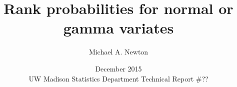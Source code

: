\newcommand{\fulltitle}{Rank probabilities for normal or gamma variates}
\newcommand{\wrappedfulltitle}{Rank probabilities for normal or gamma variates}
  
\newcommand{\longdate}{December 2015 \\
  UW Madison Statistics Department Technical Report \#?? }
\newcommand{\shortdate}{2/10}
\newcommand{\keywords}{gamma ranking; Viterbi algorithm } 


 
\renewcommand{\baselinestretch}{1.2}
\title{\wrappedfulltitle}
\author{
 \renewcommand{\thefootnote}{\arabic{footnote}}
 Michael A. Newton\footnotemark[1]
 }

\vspace{1.5in}
\date{{\normalsize \longdate}}
\maketitle
{}
\renewcommand{\baselinestretch}{\doublespaced}

\newpage
